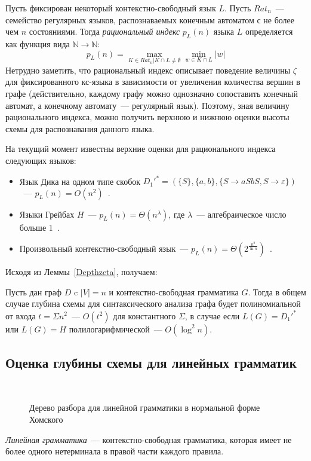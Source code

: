Пусть фиксирован некоторый контекстно-свободный язык $L$. Пусть $Rat_n$~--- семейство регулярных языков, распознаваемых конечным автоматом с не более чем $n$ состояниями. Тогда \textit{рациональный индекс} $p_L(n)$ языка $L$ определяется как функция вида $\mathbb{N} \rightarrow \mathbb{N}$:
\begin{equation}
p_L(n) = \max\limits_{K \in Rat_n | K  \cap L \neq \emptyset} \min\limits_{w \in K  \cap L } |w|
\end{equation}
Нетрудно заметить, что рациональный индекс описывает поведение величины $\zeta$ для фиксированного кс-языка в зависимости от увеличения количества вершин в графе (действительно, каждому графу можно однозначно сопоставить конечный автомат, а конечному автомату~--- регулярный язык). Поэтому, зная величину рационального индекса, можно получить верхнюю и нижнюю оценки высоты схемы для распознавания данного языка.

На текущий момент известны верхние оценки для рационального индекса следующих языков:
\begin{itemize}
	\item Язык Дика на одном типе скобок $D_1'^* = (\{S\}, \{a, b\}, \{S \rightarrow aSbS, S \rightarrow \varepsilon\})$~--- $p_L(n) = O(n^2)$~\cite{Dyck1}.
	\item Языки Грейбах $H$~--- $p_L(n) = \Theta(n^\lambda)$, где $\lambda$~--- алгебраическое число больше 1~\cite{GreibRat}.
	\item Произвольный контекстно-свободный язык~--- $p_L(n) = \Theta(2^ {\frac{n^2}{\ln n}})$~\cite{CFRat}.
\end{itemize}
Исходя из Леммы~\ref{Depthzeta}, получаем:
\begin{corollaryrus} Пусть дан граф $D$ c $|V|=n$ и контекстно-свободная грамматика $G$. Тогда в общем случае глубина схемы для синтаксического анализа графа будет полиномиальной от входа $t = \Sigma n^2$~--- $O(t^2)$ для константного $\Sigma$, в случае если $L(G) = D_1'^*$ или $L(G) = H$ полилогарифмической~--- $O(\log^2 n)$.
\end{corollaryrus}

\subsection{Оценка глубины схемы для линейных грамматик}
\begin{figure}[h!]
\centering

 \\
	\caption{Дерево разбора для линейной грамматики в нормальной форме Хомского}
\label{Linw}
\end{figure}
\textit{Линейная грамматика}~--- контекстно-свободная грамматика, которая имеет не более одного нетерминала в правой части каждого правила.

